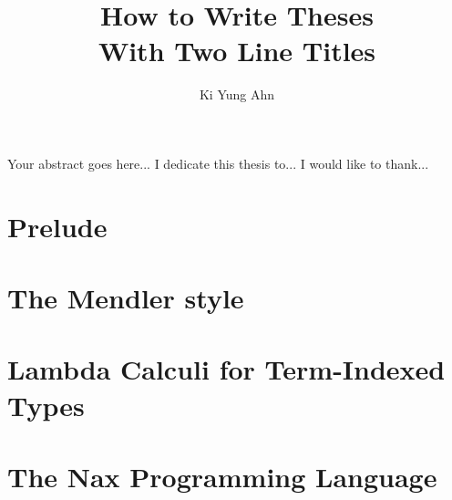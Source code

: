 \documentclass[12pt]{report}
\theoremstyle{definition}
\theoremstyle{remark}
\numberwithin{definition}{section}
\numberwithin{equation}{section}
\numberwithin{proposition}{section}
\numberwithin{conjecture}{section}
\numberwithin{theorem}{section}
\numberwithin{lemma}{section}
\numberwithin{corollary}{section}
\numberwithin{example}{section}
\numberwithin{remark}{section}
\begin{document}
\title{How to Write Theses \\ With Two Line Titles}

\author{Ki Yung Ahn}

\titlep
\prefatory
{}
    Your abstract goes here...
    I dedicate this thesis to...
    I would like to thank...

\afterpreface
\body

\part{Prelude}\label{part:Prelude}

\part{The Mendler style}\label{part:Mendler}

\part{Lambda Calculi for Term-Indexed Types}\label{part:Calculi}

\part{The Nax Programming Language}\label{part:Nax}
\end{document}
